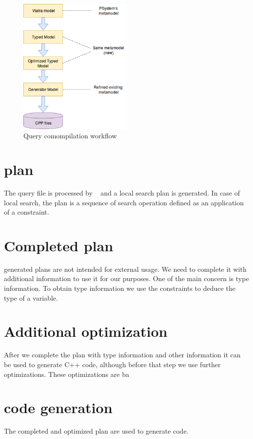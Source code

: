\begin{figure}[h]
	\begin{center}
		\includegraphics[width=0.5\textwidth]{figures/workflow.png}
		\caption{Query comompilation workflow}
		\label{figure:query-compile-workflow}
	\end{center}
\end{figure}


\section{\viatra{} plan}

The query file is processed by \viatra{}~\cite{viatra} and a local search plan is generated. In case of local search, the plan is a sequence of search operation defined as an application of a constraint.


\section{Completed plan}

\viatra{} generated plans are not intended for external usage. We need to complete it with additional information to use it for our purposes. One of the main concern is type information. To obtain type information we use the constraints to deduce the type of a variable. 


\section{Additional optimization}

After we complete the plan with type information and other information it can be used to generate C++ code, although before that step we use further optimizations. These optimizations are ba

\section{\cpp{} code generation}

The completed and optimized plan are used to generate \cpp{} code.










